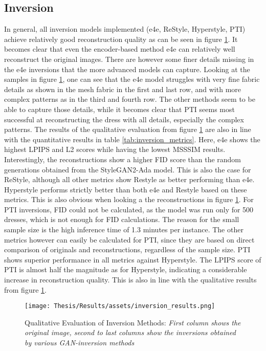 \subsection{Inversion}
In general, all inversion models implemented (e4e, ReStyle, Hyperstyle, PTI) achieve relatively good reconstruction quality as can be seen in figure \ref{fig:inversion_results}. It becomes clear that even the encoder-based method e4e can relatively well reconstruct the original images. There are however some finer details missing in the e4e inversions that the more advanced models can capture. Looking at the samples in figure \ref{fig:inversion_results}, one can see that the e4e model struggles with very fine fabric details as shown in the mesh fabric in the first and last row, and with more complex patterns as in the third and fourth row. The other methods seem to be able to capture those details, while it becomes clear that PTI seems most successful at reconstructing the dress with all details, especially the complex patterns. The results of the qualitative evaluation from figure \ref{fig:inversion_results} are also in line with the quantitative results in table \ref{tab:inversion_metrics}. Here, e4e shows the highest LPIPS and L2 scores while having the lowest MSSSIM results. Interestingly, the reconstructions show a higher FID score than the random generations obtained from the StyleGAN2-Ada model. This is also the case for ReStyle, although all other metrics show Restyle as better performing than e4e. Hyperstyle performs strictly better than both e4e and Restyle based on these metrics. This is also obvious when looking a the reconstructions in figure \ref{fig:inversion_results}. For PTI inversions, FID could not be calculated, as the model was run only for 500 dresses, which is not enough for FID calculations. The reason for the small sample size is the high inference time of 1.3 minutes per instance. The other metrics however can easily be calculated for PTI, since they are based on direct comparison of originals and reconstructions, regardless of the sample size. PTI shows superior performance in all metrics against Hyperstyle. The LPIPS score of PTI is almost half the magnitude as for Hyperstyle, indicating a considerable increase in reconstruction quality. This is also in line with the qualitative results from figure \ref{fig:inversion_results}.
\begin{figure}[ht!]
    \centering
    \texttt{[image: Thesis/Results/assets/inversion\_results.png]}
    \caption[Qualitative Evaluation of Inversion Methods]{Qualitative Evaluation of Inversion Methods: \textit{First column shows the original image, second to last columns show the inversions obtained by various GAN-inversion methods}}
    \label{fig:inversion_results}
\end{figure}
